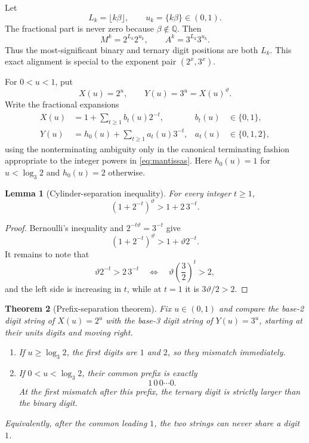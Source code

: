 \documentclass[11pt]{article}
\newtheorem{theorem}{Theorem}[section]
\newtheorem{lemma}[theorem]{Lemma}
\theoremstyle{definition}
\newcommand{\Q}{\mathbb Q}
\begin{document}
Let
\begin{equation}\label{eq:L-u}
 L_k=\lfloor k\beta\rfloor,
 \qquad
 u_k=\{k\beta\}\in(0,1).
\end{equation}
The fractional part is never zero because \(\beta\notin\Q\).  Then
\begin{equation}\label{eq:mantissas}
 M^k=2^{L_k}2^{u_k},
 \qquad
 A^k=3^{L_k}3^{u_k}.
\end{equation}
Thus the most-significant binary and ternary digit positions are both
\(L_k\).  This exact alignment is special to the exponent pair
\((2^x,3^x)\).

For \(0<u<1\), put
\begin{equation}\label{eq:xy-mantissa}
 X(u)=2^u,
 \qquad Y(u)=3^u=X(u)^\vartheta.
\end{equation}
Write the fractional expansions
\begin{align}
 X(u)&=1+\sum_{t\ge1}b_t(u)2^{-t},
 &b_t(u)&\in\{0,1\},\label{eq:Xdigits}\\
 Y(u)&=h_0(u)+\sum_{t\ge1}a_t(u)3^{-t},
 &a_t(u)&\in\{0,1,2\},\label{eq:Ydigits}
\end{align}
using the nonterminating ambiguity only in the canonical terminating
fashion appropriate to the integer powers in \cref{eq:mantissas}.
Here \(h_0(u)=1\) for \(u<\log_3 2\) and \(h_0(u)=2\) otherwise.

\begin{lemma}[Cylinder-separation inequality]\label{lem:cylinder-sep}
For every integer \(t\ge1\),
\begin{equation}\label{eq:cylinder-sep}
  (1+2^{-t})^\vartheta>1+2\,3^{-t}.
\end{equation}
\end{lemma}

\begin{proof}
Bernoulli's inequality and \(2^{-t\vartheta}=3^{-t}\) give
\[
 (1+2^{-t})^\vartheta
 >1+\vartheta2^{-t}.
\]
It remains to note that
\[
 \vartheta2^{-t}>2\,3^{-t}
 \quad\Longleftrightarrow\quad
 \vartheta\left(\frac32\right)^t>2,
\]
and the left side is increasing in \(t\), while at \(t=1\) it is
\(3\vartheta/2>2\).
\end{proof}

\begin{theorem}[Prefix-separation theorem]\label{thm:prefix-separation}
Fix \(u\in(0,1)\) and compare the base-2 digit string of \(X(u)=2^u\) with
the base-3 digit string of \(Y(u)=3^u\), starting at their units digits and
moving right.

\begin{enumerate}[label=(\alph*)]
\item If \(u\ge\log_3 2\), the first digits are \(1\) and \(2\), so they
mismatch immediately.
\item If \(0<u<\log_3 2\), their common prefix is exactly
\begin{equation}\label{eq:common-prefix-form}
  1\,0\,0\cdots0.
\end{equation}
At the first mismatch after this prefix, the ternary digit is strictly
larger than the binary digit.
\end{enumerate}
Equivalently, after the common leading \(1\), the two strings can never
share a digit \(1\).
\end{theorem}
\end{document}
